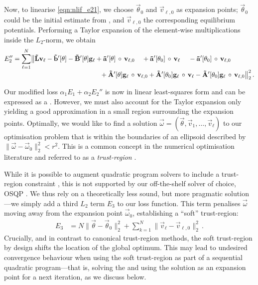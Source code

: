 \pagebreak

Now, to linearise \cref{eqn:nlif_e21}, we choose $\vec \theta_0$ and $\vec v_{\ell, 0}$ as expansion points; $\vec \theta_0$ could be the initial estimate from , and $\vec v_{\ell, 0}$ the corresponding equilibrium potentials.
Performing a Taylor expansion of the element-wise multiplications inside the $L_2$-norm, we obtain
\begin{align}
	\begin{aligned}
	E_2'' &= \sum_{\ell = 1}^N
	\bigl\|
		  \mrL \vec v_\ell
	    - \vrbp[\vec \theta]
		- \mrBp[\vec \theta] \vec g_\ell
	    + \vrap[\vec \theta] \, \circ \, \vec v_{\ell, 0} \hspace{1.1em}
	    + \vrap[\vec \theta_0] \, \circ \, \vec v_{\ell} \hspace{1.1em}\,
	    - \vrap[\vec \theta_0] \, \circ \, \vec v_{\ell, 0} \\[-0.33em]
	&\hspace{4.675cm}
		+ \mrAp[\vec \theta] \vec g_\ell \, \circ \, \vec v_{\ell, 0}
		+ \mrAp[\vec \theta_0] \vec g_\ell \, \circ \, \vec v_{\ell}
		- \mrAp[\vec \theta_0] \vec g_\ell \, \circ \, \vec v_{\ell, 0}
	\bigr\|_2^2 \,.
	\end{aligned}
\end{align}

Our modified loss $\alpha_1 E_1 + \alpha_2 E_2''$ is now in linear least-squares form and can be expressed as a \QP.
However, we must also account for the Taylor expansion only yielding a good approximation in a small region surrounding the expansion points.
Optimally, we would like to find a solution $\vec \omega = (\vec \theta, \vec v_1, \ldots, \vec v_\ell)$ to our optimisation problem that is within the boundaries of an ellipsoid described by $\| \vec \omega - \vec \omega_0 \|_2^2 < r^2$.
This is a common concept in the numerical optimisation literature and referred to as a \emph{trust-region} \citep[Chapter~4]{nocedal2006numerical}.

While it is possible to augment quadratic program solvers to include a trust-region constraint \citep[Chapter~18]{nocedal2006numerical}, this is not supported by our off-the-shelf \QP solver of choice, OSQP \citep{stellato2020osqp}.
We thus rely on a theoretically less sound, but more pragmatic solution---we simply add a third $L_2$ term $E_3$ to our loss function.
This term penalises $\vec \omega$ moving away from the expansion point $\vec \omega_0$, establishing a \enquote{soft} trust-region:
\begin{align}
	E_3 &= N \| \vec \theta - \vec \theta_0 \|_2^2 + \sum_{k=1}^N \| \vec v_\ell - \vec v_{\ell, 0} \|_2^2 \,.
	\label{eqn:nlif_e3}
\end{align}
Crucially, and in contrast to canonical trust-region methods, the soft trust-region by design shifts the location of the global optimum.
This may lead to undesired convergence behaviour when using the soft trust-region as part of a sequential quadratic program---that is, solving the \QP and using the solution as an expansion point for a next iteration, as we discuss below.

